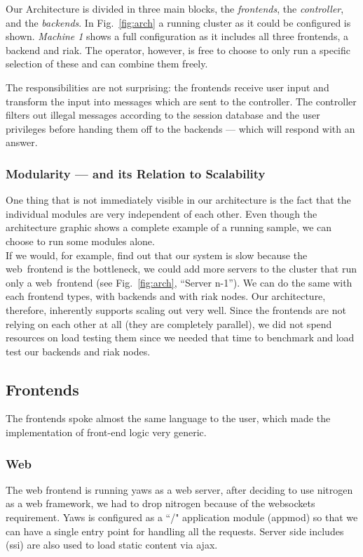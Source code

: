 \documentclass[11pt,a4paper]{report}
\begin{document}
Our Architecture is divided in three main blocks, the {\em frontends}, the 
{\em controller}, and the {\em backends}. In Fig.~\ref{fig:arch} a running
cluster as it could be configured is shown. {\em Machine 1} shows a full
configuration as it includes all three frontends, a backend and riak. The
operator, however, is free to choose to only run a specific selection of these
and can combine them freely.

The responsibilities are not surprising: the frontends receive user input and
transform the input into messages which are sent to the controller.
The controller filters out illegal messages according to the session database
and the user privileges before handing them off to the backends --- which will
respond with an answer.
\subsubsection{Modularity --- and its Relation to Scalability}
One thing that is not immediately visible in our architecture is the fact that
the individual modules are very independent of each other. Even though the
architecture graphic shows a complete example of a running sample, we can choose
to run some modules alone. \\
If we would, for example, find out that our system is slow because the
web~frontend is the bottleneck, we could add more servers to the cluster that
run only a web~frontend (see Fig.~\ref{fig:arch}, ``Server n-1'').
We can do the same with each frontend types, with backends and with riak nodes.
Our architecture, therefore, inherently supports scaling out very well.
Since the frontends are not relying on each other at all (they are completely
parallel), we did not spend resources on load testing them since we needed that
time to benchmark and load test our backends and riak nodes.
\subsection{Frontends}
\label{sec:frontends}
The frontends spoke almost the same language to the user, which made the
implementation of front-end logic very generic.

\subsubsection{Web}
The web frontend is running yaws as a web server, after deciding to use nitrogen
as a web framework, we had to drop nitrogen because of the websockets
requirement. Yaws is configured as a ``/" application module (appmod) so that we can have a single entry point for handling all the requests. Server side includes (ssi) are also used to load static content via ajax.
\end{document}
